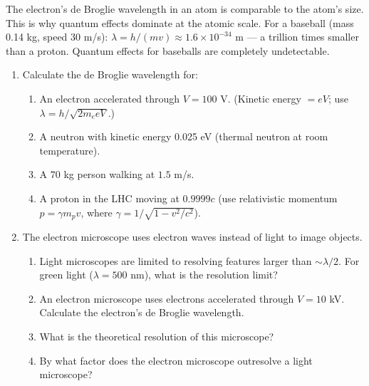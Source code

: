 \documentclass[12pt, a4paper]{book}
\begin{document}
The electron's de Broglie wavelength in an atom is comparable
to the atom's size.
This is why quantum effects dominate at the atomic scale.
For a baseball (mass 0.14 kg, speed 30 m/s):
$\lambda = h/(mv) \approx 1.6\times10^{-34}$ m ---
a trillion times smaller than a proton.
Quantum effects for baseballs are completely undetectable.

\begin{problembox}
\begin{enumerate}[label=\textbf{\arabic*.}]
  \item Calculate the de Broglie wavelength for:
        \begin{enumerate}[label=(\alph*)]
          \item An electron accelerated through $V = 100$ V.
                (Kinetic energy $= eV$; use $\lambda = h/\sqrt{2m_e eV}$.)
          \item A neutron with kinetic energy 0.025 eV
                (thermal neutron at room temperature).
          \item A $70$ kg person walking at $1.5$ m/s.
          \item A proton in the LHC moving at $0.9999c$
                (use relativistic momentum $p = \gamma m_p v$,
                where $\gamma = 1/\sqrt{1-v^2/c^2}$).
        \end{enumerate}

  \item The electron microscope uses electron waves
        instead of light to image objects.
        \begin{enumerate}[label=(\alph*)]
          \item Light microscopes are limited to resolving
                features larger than $\sim\lambda/2$.
                For green light ($\lambda = 500$ nm),
                what is the resolution limit?
          \item An electron microscope uses electrons
                accelerated through $V = 10$ kV.
                Calculate the electron's de Broglie wavelength.
          \item What is the theoretical resolution of this microscope?
          \item By what factor does the electron microscope
                outresolve a light microscope?
        \end{enumerate}
\end{enumerate}
\end{problembox}

\end{document}
